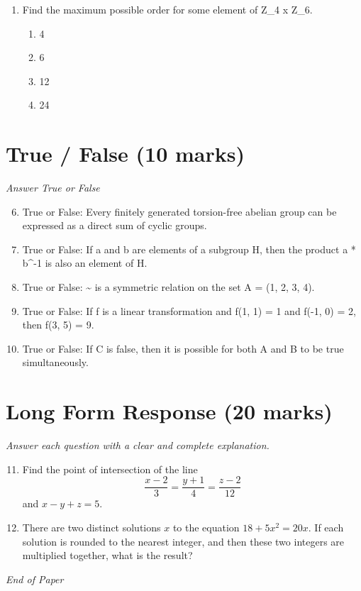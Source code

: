 \documentclass[12pt]{article}
\begin{document}
\begin{enumerate}[label=\arabic*.]
\begin{enumerate}[label=(\alph*)]
    \item 27
    \item 28
    \item 35
    \item 37
\end{enumerate}
\item Find the maximum possible order for some element of Z\_4 x Z\_6.
\begin{enumerate}[label=(\alph*)]
    \item 4
    \item 6
    \item 12
    \item 24
\end{enumerate}
\end{enumerate}

\section*{True / False (10 marks)}
\textit{Answer True or False}
\begin{enumerate}[label=\arabic*.]
\setcounter{enumi}{5}
\item True or False: Every finitely generated torsion-free abelian group can be expressed as a direct sum of cyclic groups.
\item True or False: If a and b are elements of a subgroup H, then the product a * b^-1 is also an element of H.
\item True or False: \textasciitilde{} is a symmetric relation on the set A = (1, 2, 3, 4).
\item True or False: If f is a linear transformation and f(1, 1) = 1 and f(-1, 0) = 2, then f(3, 5) = 9.
\item True or False: If C is false, then it is possible for both A and B to be true simultaneously.
\end{enumerate}

\section*{Long Form Response (20 marks)}
\textit{Answer each question with a clear and complete explanation.}
\begin{enumerate}[label=\arabic*.]
\setcounter{enumi}{10}
\item Find the point of intersection of the line \[\frac{x - 2}{3} = \frac{y + 1}{4} = \frac{z - 2}{12}\]and $x - y + z = 5.$
\item There are two distinct solutions $x$ to the equation $18+5 x^2=20 x$. If each solution is rounded to the nearest integer, and then these two integers are multiplied together, what is the result?
\end{enumerate}

\vfill
\noindent\textit{End of Paper}
\end{document}
